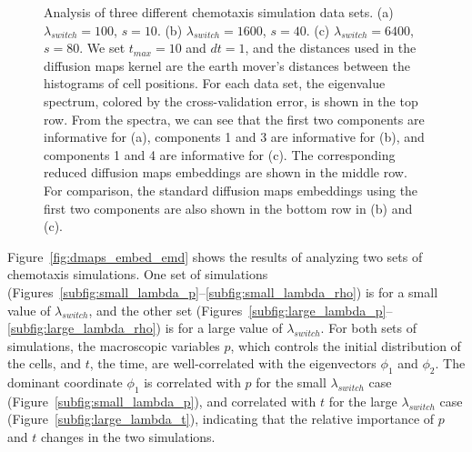 \begin{figure}[t]
\begin{subfigure}[t]{2in}
\caption{}
\end{subfigure}
%
\caption{Analysis of three different chemotaxis simulation data sets. (a) $\lambda_{switch} = 100$, $s = 10$. (b) $\lambda_{switch} = 1600$, $s = 40$. (c) $\lambda_{switch} = 6400$, $s = 80$. We set $t_{max} = 10$ and $dt=1$, and the distances used in the diffusion maps kernel are the earth mover's distances between the histograms of cell positions. For each data set, the eigenvalue spectrum, colored by the cross-validation error, is shown in the top row. From the spectra, we can see that the first two components are informative for (a), components 1 and 3 are informative for (b), and components 1 and 4 are informative for (c). The corresponding reduced diffusion maps embeddings are shown in the middle row. For comparison, the standard diffusion maps embeddings using the first two components are also shown in the bottom row in (b) and (c).}
%
\label{fig:chemotaxis_simulations_harmonics}
\end{figure}

Figure~\ref{fig:dmaps_embed_emd} shows the results of analyzing two sets of chemotaxis simulations.
%
One set of simulations (Figures~\ref{subfig:small_lambda_p}--\ref{subfig:small_lambda_rho}) is for a small value of $\lambda_{switch}$, and the other set (Figures~\ref{subfig:large_lambda_p}--\ref{subfig:large_lambda_rho}) is for a large value of $\lambda_{switch}$.
%
For both sets of simulations, the macroscopic variables $p$, which controls the initial distribution of the cells, and $t$, the time, are well-correlated with the eigenvectors $\phi_1$ and $\phi_2$.
%
%
The dominant coordinate $\phi_1$ is correlated with $p$ for the small $\lambda_{switch}$ case (Figure~\ref{subfig:small_lambda_p}), and correlated with $t$ for the large $\lambda_{switch}$ case (Figure~\ref{subfig:large_lambda_t}), indicating that the relative importance of $p$ and $t$ changes in the two simulations.
%

